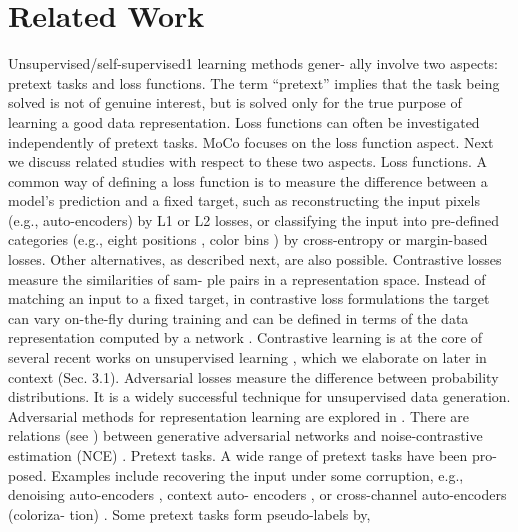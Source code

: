 \documentclass[10pt,twocolumn]{article}  %
\begin{document}
\section{Related Work}
\hspace{1em} Unsupervised/self-supervised1 learning methods gener-
ally involve two aspects: pretext tasks and loss functions.
The term “pretext” implies that the task being solved is not
of genuine interest, but is solved only for the true purpose
of learning a good data representation. Loss functions can
often be investigated independently of pretext tasks. MoCo
focuses on the loss function aspect. Next we discuss related
studies with respect to these two aspects.
Loss functions. A common way of deﬁning a loss function
is to measure the difference between a model's prediction
and a ﬁxed target, such as reconstructing the input pixels
(e.g., auto-encoders) by L1 or L2 losses, or classifying the
input into pre-deﬁned categories (e.g., eight positions \cite{13_doersch2015unsupervised},
color bins \cite{64_zhang2016colorful}) by cross-entropy or margin-based losses.
Other alternatives, as described next, are also possible.
Contrastive losses \cite{29_hadsell2006dimensionality} measure the similarities of sam-
ple pairs in a representation space. Instead of matching an
input to a ﬁxed target, in contrastive loss formulations the
target can vary on-the-ﬂy during training and can be deﬁned
in terms of the data representation computed by a network
\cite{29_hadsell2006dimensionality}. Contrastive learning is at the core of several recent
works on unsupervised learning \cite{61_wu2018unsupervised, 46_oord2018representation, 36_hjelm2019learning, 66_zhuang2019local, 35_henaff2019data, 56_tian2019contrastive, 2_bachman2019learning},
which we elaborate on later in context (Sec. 3.1).
Adversarial losses \cite{24_goodfellow2014generative} measure the difference between
probability distributions. It is a widely successful technique
for unsupervised data generation. Adversarial methods for
representation learning are explored in \cite{15_donahue2017adversarial, 16_donahue2019large}. There are
relations (see \cite{24_goodfellow2014generative}) between generative adversarial networks
and noise-contrastive estimation (NCE) \cite{28_gutmann2010noise}.
Pretext tasks. A wide range of pretext tasks have been pro-
posed. Examples include recovering the input under some
corruption, e.g., denoising auto-encoders \cite{58_vincent2008denoising}, context auto-
encoders \cite{48_pathak2016context}, or cross-channel auto-encoders (coloriza-
tion) \cite{64_zhang2016colorful, 65_zhang2017splitbrain}. Some pretext tasks form pseudo-labels by,
\end{document}
